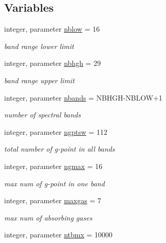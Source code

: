 \subsection*{Variables}
\begin{DoxyCompactItemize}
\item 
integer, parameter \hyperlink{namespacemodule__radsw__parameters_a2c5efc91f02dc0d4bdbd5e490f44c19c}{nblow} = 16
\begin{DoxyCompactList}\small\item\em band range lower limit \end{DoxyCompactList}\item 
integer, parameter \hyperlink{namespacemodule__radsw__parameters_a39e5ca4fd5defbc2545ee39bbf50d61b}{nbhgh} = 29
\begin{DoxyCompactList}\small\item\em band range upper limit \end{DoxyCompactList}\item 
integer, parameter \hyperlink{namespacemodule__radsw__parameters_a8f97b7698e8e5e2aec6e463fd09255cc}{nbands} = N\+B\+H\+GH-\/N\+B\+L\+OW+1
\begin{DoxyCompactList}\small\item\em number of spectral bands \end{DoxyCompactList}\item 
integer, parameter \hyperlink{namespacemodule__radsw__parameters_adc3e4d5a848d50e2883e05c62f61bc97}{ngptsw} = 112
\begin{DoxyCompactList}\small\item\em total number of g-\/point in all bands \end{DoxyCompactList}\item 
integer, parameter \hyperlink{namespacemodule__radsw__parameters_a0ba0ff5c18d3303a852d88687b4b5ca9}{ngmax} = 16
\begin{DoxyCompactList}\small\item\em max num of g-\/point in one band \end{DoxyCompactList}\item 
integer, parameter \hyperlink{namespacemodule__radsw__parameters_a5bc6fbb4231281a604352eec6b8e2bfc}{maxgas} = 7
\begin{DoxyCompactList}\small\item\em max num of absorbing gases \end{DoxyCompactList}\item 
integer, parameter \hyperlink{namespacemodule__radsw__parameters_a4bd72558be40bfccfb78c48e640acd07}{ntbmx} = 10000

\end{DoxyCompactItemize}
